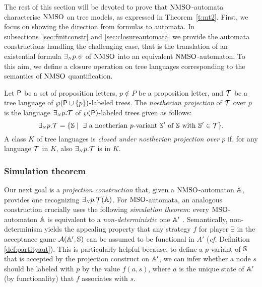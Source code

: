 

The rest of this section will be devoted to prove that $\mathrm{NMSO}$-automata
characterise $\mathrm{NMSO}$ on tree models, as expressed in Theorem~\ref{t:mt2}.
First, we focus on showing the direction from formulas to automata.
In subsections~\ref{sec:finitconstr} and \ref{sec:closureautomata} we provide
the automata constructions handling the challenging case, that is the
translation of an existential formula $\exists_{{\scriptscriptstyle N}} p.\psi$ of $\mathrm{NMSO}$ into an
equivalent $\mathrm{NMSO}$-automaton.
To this aim, we define a closure operation on tree languages corresponding
to the semantics of $\mathrm{NMSO}$ quantification.

\begin{definition}\label{def:tree_finproj}
Let $\mathsf{P}$ be a set of proposition letters, $p \not\in P$ be a proposition letter, and $\mathcal{T}$ be a tree language of $\wp (\mathsf{P}\cup\{p\})$-labeled
trees.
The \emph{noetherian projection} of $\mathcal{T}$ over $p$ is the language
$\exists_{{\scriptscriptstyle N}} p.\mathcal{T}$ of $\wp (\mathsf{P})$-labeled trees %
given as follows:
%
$$
\noetexists p.\trees = \{\model \mid \text{ $\exists$ a noetherian $p$-variant } \model' \text{ of } \model \text{ with } \model' \in \trees\}.
$$
%
A class $K$ of tree languages is \emph{closed under noetherian projection
over $p$} if, for any language $\mathcal{T}$ in $K$, also ${\exists_{{\scriptscriptstyle N}} p}.\mathcal{T}$ is in $K$.
\end{definition} 

\subsubsection{Simulation theorem}


Our next goal is a \emph{projection construction} that, given
a $\mathrm{NMSO}$-automaton $\mathbb{A}$, provides one recognizing ${\exists_{{\scriptscriptstyle N}} p}.\mathcal{T}(\mathbb{A})$. For $\mathrm{MSO}$-automata, an analogous construction crucially uses the following \emph{simulation theorem}: every
$\mathrm{MSO}$-automaton $\mathbb{A}$ is equivalent to a \emph{non-deterministic} one $\mathbb{A}'$ \cite{Walukiewicz96}. Semantically, non-determinism yields the appealing property that any strategy $f$ for player $\exists$ in the acceptance game $\mathcal{A}(\mathbb{A}',\mathbb{S})$ can be assumed to be functional in $A'$ (\emph{cf.} Definition \ref{def:partityaut}).
This is particularly helpful because, to define a $p$-variant of $\mathbb{S}$
that is accepted by the projection construct on $\mathbb{A}'$, we
can infer whether a node $s$ should be labeled with $p$ by the value $f(a,s)$, where $a$ is the unique state of $\mathbb{A}'$ (by functionality) that $f$ associates with $s$.

